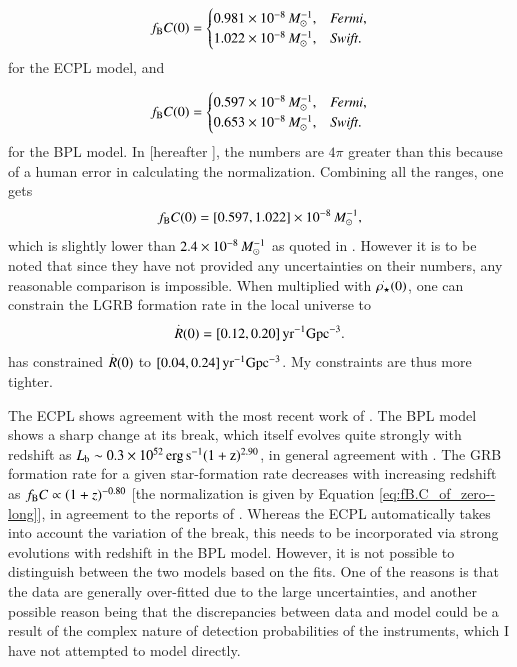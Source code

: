 \begin{equation}
f_{\rm{B}} C(0) = \begin{cases}
0.981 \times 10^{-8} \, M_{\odot}^{-1}, & \emph{Fermi},\\
1.022 \times 10^{-8} \, M_{\odot}^{-1}, & \emph{Swift}.
\end{cases}
\label{eq:fB.C_of_zero_ECPL--long}
\end{equation} for the ECPL model, and

\begin{equation}
f_{\rm{B}} C(0) = \begin{cases}
0.597 \times 10^{-8} \, M_{\odot}^{-1}, & \emph{Fermi},\\
0.653 \times 10^{-8} \, M_{\odot}^{-1}, & \emph{Swift}.
\end{cases}
\label{eq:fB.C_of_zero_BPL--long}
\end{equation} for the BPL model. In \cite{Paul-2018-MNRAS--long} [hereafter ], the numbers are $4 \pi$ greater than this because of a human error in calculating the normalization. Combining all the ranges, one gets
\begin{equation}
f_{\rm{B}} C(0) = [0.597, 1.022] \times 10^{-8} \, M_{\odot}^{-1},
\label{eq:fB.C_of_zero--long}
\end{equation} which is slightly lower than $2.4 \times 10^{-8} \, M_{\odot}^{-1}$ as quoted in . However it is to be noted that since they have not provided any uncertainties on their numbers, any reasonable comparison is impossible. When multiplied with $\overset{.}{\rho_{\star}}(0)$, one can constrain the LGRB formation rate in the local universe to
\begin{equation}
\overset{.}{R}(0) = [0.12, 0.20] \, {\rm yr^{-1}Gpc^{-3}}.
\label{eq:Rdot0--long}
\end{equation}  has constrained $\overset{.}{R}(0)$ to $[0.04, 0.24] \, {\rm yr^{-1}Gpc^{-3}}$. My constraints are thus more tighter.

The ECPL shows agreement with the most recent work of . The BPL model shows a sharp change at its break, which itself evolves quite strongly with redshift as $L_{\rm{b}} \sim 0.3 \times 10^{52} \, \rm erg \, s^{-1} (1+z)^{2.90}$, in general agreement with . The GRB formation rate for a given star-formation rate decreases with increasing redshift as $f_{\rm{B}} C \propto (1+z)^{-0.80}$ [the normalization is given by Equation \ref{eq:fB.C_of_zero--long}], in agreement to the reports of . Whereas the ECPL automatically takes into account the variation of the break, this needs to be incorporated via  strong evolutions with redshift in the BPL model. However, it is not possible to distinguish between the two models based on the fits. One of the reasons is that the data are generally over-fitted due to the large uncertainties, and another possible reason being that the discrepancies between data and model could be a result of the complex nature of detection probabilities of the instruments, which I have not attempted to model directly.

